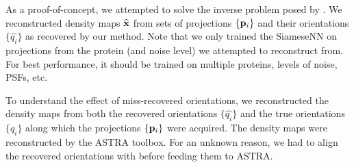 As a proof-of-concept, we attempted to solve the inverse problem posed by .
We reconstructed density maps $\widehat{\mathbf{x}}$ from sets of projections $\{ \mathbf{p}_i \}$ and their orientations $\{ \widehat{q_i} \}$ as recovered by our method.
Note that we only trained the SiameseNN  on projections from the protein (and noise level) we attempted to reconstruct from.
For best performance, it should be trained on multiple proteins, levels of noise, PSFs, etc.

To understand the effect of miss-recovered orientations, we reconstructed the density maps from both the recovered orientations $\{ \widehat{q_i} \}$ and the true orientations $\{ q_i \}$ along which the projections $\{ \mathbf{p}_i \}$ were acquired.
The density maps were reconstructed by the ASTRA toolbox.
For an unknown reason, we had to align the recovered orientations with  before feeding them to ASTRA.


